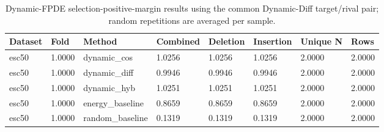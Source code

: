 \begin{table}[htbp]
\centering
\caption{Dynamic-FPDE selection-positive-margin results using the common Dynamic-Diff target/rival pair; random repetitions are averaged per sample.}
\label{tab:dynamic-fpde-positive-margin-results}
\begin{tabular}{llllllll}
\toprule
Dataset & Fold & Method & Combined & Deletion & Insertion & Unique N & Rows \\
\midrule
esc50 & 1.0000 & dynamic\_cos & 1.0256 & 1.0256 & 1.0256 & 2.0000 & 2.0000 \\
esc50 & 1.0000 & dynamic\_diff & 0.9946 & 0.9946 & 0.9946 & 2.0000 & 2.0000 \\
esc50 & 1.0000 & dynamic\_hyb & 1.0251 & 1.0251 & 1.0251 & 2.0000 & 2.0000 \\
esc50 & 1.0000 & energy\_baseline & 0.8659 & 0.8659 & 0.8659 & 2.0000 & 2.0000 \\
esc50 & 1.0000 & random\_baseline & 0.1319 & 0.1319 & 0.1319 & 2.0000 & 2.0000 \\
\bottomrule
\end{tabular}
\end{table}
